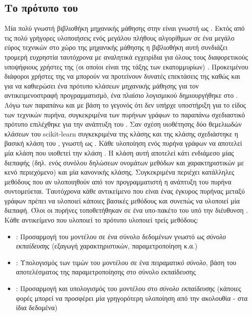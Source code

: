 \subsection{Το πρότυπο του }
Μία πολύ γνωστή βιβλιοθήκη μηχανικής μάθησης στην  είναι γνωστή ως . Εκτός από τις πολύ γρήγορες υλοποιήσεις ενός μεγάλου πλήθους αλγορίθμων σε ένα μεγάλο εύρος τεχνικών στο χώρο της μηχανικής μάθησης η βιβλιοθήκη αυτή συνδιάζει τρομερή ευχρηστία ταυτόχρονα με αναλητικά εγχειρίδια για όλους τους διαφορετικούς υποψήφιους χρήστες της (οι οποίοι είναι της τάξης των εκατομμυρίων) \cite{scikit}.
Προκειμένου διάφοροι χρήστες της να μπορούν να προτείνουν δυνατές επεκτάσεις της καθώς και για να καθιερώσει ένα πρότυπο κλάσεων μηχανικής μάθησης για τον αντικειμενοστραφή προγραμματισμό, ένα πλαίσιο λογισμικού  δημιουργήθηκε στο .
Λόγω των παραπάνω και με βάση το γεγονός ότι δεν υπήρχε υποστήριξη για το είδος των τεχνικών πυρήνα, συγκεκριμένα των πυρήνων γράφων το παραπάνω σχεδιαστικό πρότυπο επιλέχθηκε για την ανάπτυξη του .
Σαν σχέση υιοθέτησης δύο θεμελιωδών κλάσεων του scikit-learn συγκεκριμένα της κλάσης  και της κλάσης  σχεδιάστηκε η βασική κλάση του , γνωστή ως .
Κάθε υλοποίηση ενός πυρήνα γράφων να αποτελεί μία κλάση που υιοθετεί την κλάση . 
Η κλάση αυτή αποτελεί κάτι ενδιάμεσο μίας διεπαφής (δηλ. ενός συνόλου δηλώσεων ονομάτων μεθόδων και χαρακτηριστικών με κενό περιεχόμενο) και μία κανονικής κλάσης.
Συγκεκριμένα περιέχει κατάλληλες μεθόδους που αν υλοποιηθούν από τον προγραμματιστή η ανάπτυξη του πυρήνα συντομεύεται.
Tαυτόχρονα κάθε αντικείμενο που είναι ένας έγκυρος πυρήνας μεταξύ γράφων πρέπει να υλοποιεί κάποιες βασικές μεθόδους και συνεπώς να υλοποιεί μία διεπαφή.
Όλοι οι πυρήνες τοποθετήθηκαν σε ένα υπο-πακέτο του  υπό την διέυθυνση .
Κάθε αντικείμενο που υλοποιεί το πρότυπο  υλοποιεί τρείς μεθόδους:
  \begin{itemize}
    \item \texttt{}: Προσαρμογή του μοντέλου σε ένα σύνολο δεδομένων γνωστό ως \textit{σύνολο εκπαίδευσης} (εξαγωγή χαρακτηριστικών, παραμετροποίηση κ.α.)
    \item \texttt{}: Υπολογισμός των τιμών του μοντέλου σε ένα \textit{πειραματικό σύνολο}, βάση του αποτελέσματος της παραμετροποίησης στο σύνολο εκπαίδευσης
    \item \texttt{}: Προσαρμογή και υπολογισμός του μοντέλου στο \textit{σύνολο εκπαίδευσης} (κάποιες φορές μπορεί να προσφέρει μία γρηγορότερη υλοποίηση από την ακολουθία \texttt{} - \texttt{} στα ίδια δεδομένα)
\end{itemize}
